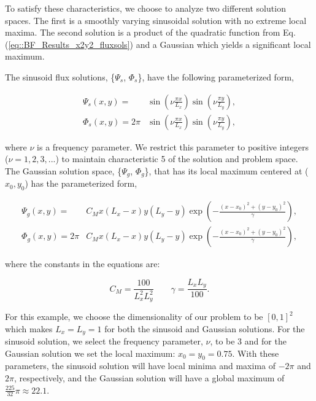 \noindent To satisfy these characteristics, we choose to analyze two different solution spaces. The first is a smoothly varying sinusoidal solution with no extreme local maxima. The second solution is a product of the quadratic function from Eq. (\ref{eq::BF_Results_x2y2_fluxsols}) and a Gaussian which yields a significant local maximum. 

The sinusoid flux solutions, \{$\Psi_s$, $\Phi_s$\}, have the following parameterized form,

\begin{equation}
\label{eq::BF_Results_MMS_sinefluxsols}
\begin{aligned}
\Psi_s (x,y) = &\sin(\nu  \frac{\pi x}{L_x}) \sin(\nu  \frac{\pi y}{L_y}), \\ 
\Phi_s (x,y) = 2 \pi &\sin(\nu  \frac{\pi x}{L_x}) \sin(\nu  \frac{\pi y}{L_y}),
\end{aligned} 
\end{equation}

\noindent where $\nu$ is a frequency parameter. We restrict this parameter to positive integers ($\nu = 1,2,3,...$) to maintain characteristic 5 of the solution and problem space. The Gaussian solution space, \{$\Psi_g$, $\Phi_g$\}, that has its local maximum centered at ($x_0,y_0$) has the parameterized form,

\begin{equation}
\label{eq::BF_Results_MMS_gaussfluxsols}
\begin{aligned}
\Psi_g (x,y) = &C_M x (L_x - x) y (L_y - y) \exp(-\frac{(x-x_0)^2 + (y-y_0)^2}{\gamma}), \\ 
\Phi_g (x,y) = 2 \pi &C_M x (L_x - x) y (L_y - y) \exp(-\frac{(x-x_0)^2 + (y-y_0)^2}{\gamma}),
\end{aligned} 
\end{equation}

\noindent where the constants in the equations are:

\begin{equation}
\label{eq::BF_Results_MMS_gaussconsts}
C_M = \frac{100}{L_x^2 L_y^2} \qquad \gamma = \frac{L_x L_y}{100} .
\end{equation}

For this example, we choose the dimensionality of our problem to be $[0,1]^2$ which makes $L_x=L_y=1$ for both the sinusoid and Gaussian solutions. For the sinusoid solution, we select the frequency parameter, $\nu$, to be 3 and for the Gaussian solution we set the local maximum: $x_0=y_0 = 0.75$. With these parameters, the sinusoid solution will have local minima and maxima of $-2 \pi$ and $2 \pi$, respectively, and the Gaussian solution will have a global maximum of $\frac{225}{32} \pi \approx 22.1$.

